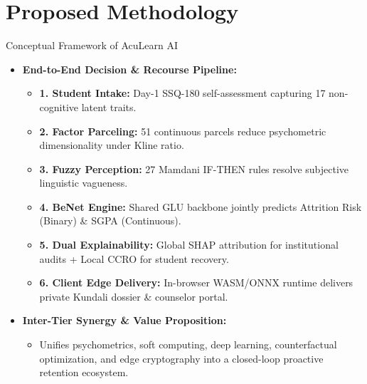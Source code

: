 \documentclass{beamer}
\begin{document}
\section{Proposed Methodology}

\begin{frame}[t]{Conceptual Framework of AcuLearn AI}
  \begin{itemize}\setlength{\itemsep}{6pt}\small
    \item \textbf{End-to-End Decision \& Recourse Pipeline:}
    \begin{itemize}\setlength{\itemsep}{3pt}\footnotesize
      \item \textbf{1. Student Intake:} Day-1 SSQ-180 self-assessment capturing 17 non-cognitive latent traits.
      \item \textbf{2. Factor Parceling:} 51 continuous parcels reduce psychometric dimensionality under Kline ratio.
      \item \textbf{3. Fuzzy Perception:} 27 Mamdani IF-THEN rules resolve subjective linguistic vagueness.
      \item \textbf{4. BeNet Engine:} Shared GLU backbone jointly predicts Attrition Risk (Binary) \& SGPA (Continuous).
      \item \textbf{5. Dual Explainability:} Global SHAP attribution for institutional audits + Local CCRO for student recovery.
      \item \textbf{6. Client Edge Delivery:} In-browser WASM/ONNX runtime delivers private Kundali dossier \& counselor portal.
    \end{itemize}
    \item \textbf{Inter-Tier Synergy \& Value Proposition:}
    \begin{itemize}\setlength{\itemsep}{2pt}\footnotesize
      \item Unifies psychometrics, soft computing, deep learning, counterfactual optimization, and edge cryptography into a closed-loop proactive retention ecosystem.
    \end{itemize}
  \end{itemize}
\end{frame}
\end{document}
